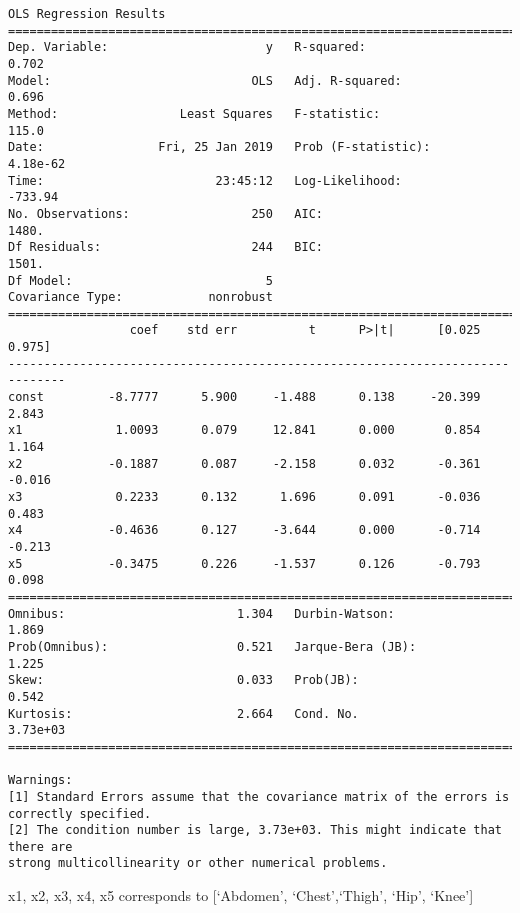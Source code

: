 \documentclass[11pt]{article}
\begin{document}
    \begin{Verbatim}[commandchars=\\\{\}]
                            OLS Regression Results                            
==============================================================================
Dep. Variable:                      y   R-squared:                       0.702
Model:                            OLS   Adj. R-squared:                  0.696
Method:                 Least Squares   F-statistic:                     115.0
Date:                Fri, 25 Jan 2019   Prob (F-statistic):           4.18e-62
Time:                        23:45:12   Log-Likelihood:                -733.94
No. Observations:                 250   AIC:                             1480.
Df Residuals:                     244   BIC:                             1501.
Df Model:                           5                                         
Covariance Type:            nonrobust                                         
==============================================================================
                 coef    std err          t      P>|t|      [0.025      0.975]
------------------------------------------------------------------------------
const         -8.7777      5.900     -1.488      0.138     -20.399       2.843
x1             1.0093      0.079     12.841      0.000       0.854       1.164
x2            -0.1887      0.087     -2.158      0.032      -0.361      -0.016
x3             0.2233      0.132      1.696      0.091      -0.036       0.483
x4            -0.4636      0.127     -3.644      0.000      -0.714      -0.213
x5            -0.3475      0.226     -1.537      0.126      -0.793       0.098
==============================================================================
Omnibus:                        1.304   Durbin-Watson:                   1.869
Prob(Omnibus):                  0.521   Jarque-Bera (JB):                1.225
Skew:                           0.033   Prob(JB):                        0.542
Kurtosis:                       2.664   Cond. No.                     3.73e+03
==============================================================================

Warnings:
[1] Standard Errors assume that the covariance matrix of the errors is correctly specified.
[2] The condition number is large, 3.73e+03. This might indicate that there are
strong multicollinearity or other numerical problems.

    \end{Verbatim}

    x1, x2, x3, x4, x5 corresponds to {[}`Abdomen', `Chest',`Thigh', `Hip',
`Knee'{]}
\end{document}

